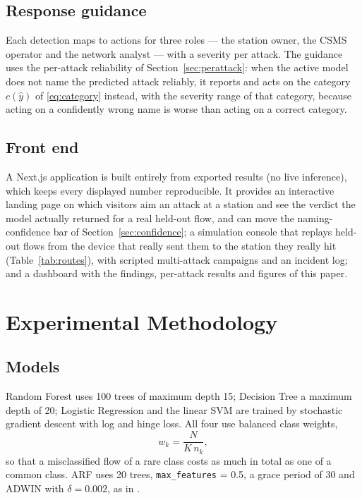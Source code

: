 \documentclass[conference]{IEEEtran}
\newcommand{\col}[1]{\texttt{\small #1}}
\begin{document}
\subsection{Response guidance}

Each detection maps to actions for three roles --- the station owner, the CSMS operator and the network analyst --- with a severity per attack. The guidance uses the per-attack reliability of Section~\ref{sec:perattack}: when the active model does not name the predicted attack reliably, it reports and acts on the category $c(\hat{y})$ of \eqref{eq:category} instead, with the severity range of that category, because acting on a confidently wrong name is worse than acting on a correct category.

\subsection{Front end}

A Next.js application is built entirely from exported results (no live inference), which keeps every displayed number reproducible. It provides an interactive landing page on which visitors aim an attack at a station and see the verdict the model actually returned for a real held-out flow, and can move the naming-confidence bar of Section~\ref{sec:confidence}; a simulation console that replays held-out flows from the device that really sent them to the station they really hit (Table~\ref{tab:routes}), with scripted multi-attack campaigns and an incident log; and a dashboard with the findings, per-attack results and figures of this paper.

\section{Experimental Methodology}
\label{sec:method}

\subsection{Models}

Random Forest uses 100 trees of maximum depth 15; Decision Tree a maximum depth of 20; Logistic Regression and the linear SVM are trained by stochastic gradient descent with log and hinge loss. All four use balanced class weights,
\begin{equation}
w_k = \frac{N}{K\, n_k},
\label{eq:weights}
\end{equation}
so that a misclassified flow of a rare class costs as much in total as one of a common class. ARF \cite{b6} uses 20 trees, \col{max\_features} = 0.5, a grace period of 30 and ADWIN with $\delta = 0.002$, as in \cite{b4}.
\end{document}
